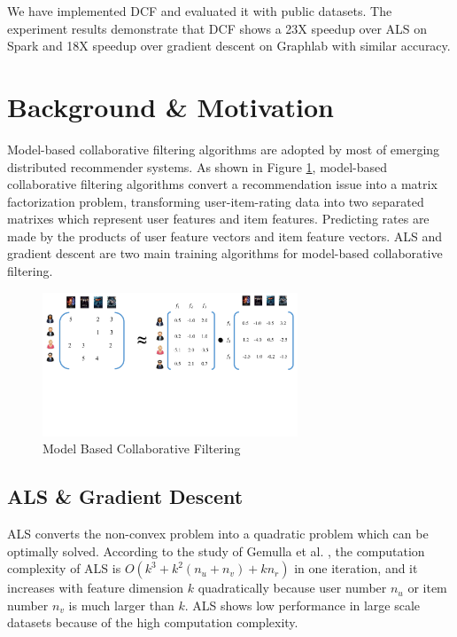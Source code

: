\documentclass{llncs}
\begin{document}
We have implemented DCF and evaluated it with public datasets. The experiment results demonstrate that DCF shows a 23X speedup over ALS on Spark and 18X speedup over gradient descent on Graphlab with similar accuracy.

\vspace{-10pt}

\section{Background \& Motivation}
\vspace{-10pt}

\label{sec:background}

Model-based collaborative filtering algorithms are adopted by most of emerging distributed recommender systems. As shown in Figure \ref{fig:MF}, model-based collaborative filtering algorithms convert a recommendation issue into a matrix factorization problem, transforming user-item-rating data into two separated matrixes which represent user features and item features. Predicting rates are made by the products of user feature vectors and item feature vectors.
ALS and gradient descent are two main training algorithms for model-based collaborative filtering.
\vspace{-5pt}

\begin{figure}[!htb]
\centering
\includegraphics[width=3in]{pics/MFIntroduction.pdf}
\vspace{-60pt}
\caption{Model Based Collaborative Filtering}
\vspace{-15pt}
\label{fig:MF}
\end{figure}

\subsection{ALS \& Gradient Descent}
\label{sub:gd}

ALS \cite{ALS} converts the non-convex problem into a quadratic problem which can be optimally solved. According to the study of Gemulla et al. \cite{ibm2011}, the computation complexity of ALS is $O(k^3 + k^2(n_u + n_v) + kn_r)$ in one iteration, and it increases with feature dimension $k$ quadratically because user number $n_u$ or item number $n_v$ is much larger than $k$. ALS shows low performance in large scale datasets because of the high computation complexity.
\end{document}
